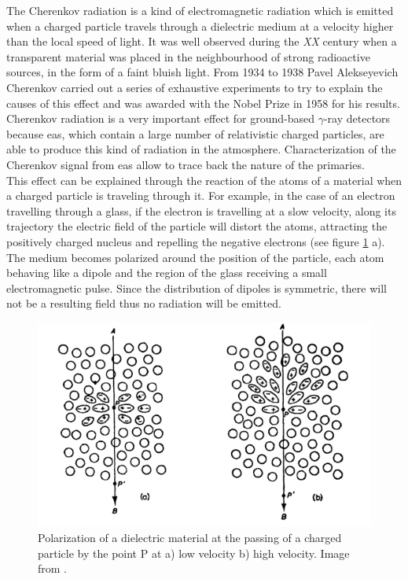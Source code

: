 \documentclass[main.tex]{subfiles}
\begin{document}
The Cherenkov radiation is a kind of electromagnetic radiation which is emitted when a charged particle travels through a dielectric medium at a velocity higher than the local speed of light. It was well observed during the \textit{XX} century when a transparent material was placed in the neighbourhood of strong radioactive sources, in the form of a faint bluish light. From 1934 to 1938 Pavel Alekseyevich Cherenkov carried out a series of exhaustive experiments to try to explain the causes of this effect and was awarded with the Nobel Prize in 1958 for his results.\\
Cherenkov radiation is a very important effect for ground-based $\gamma$-ray detectors because \gls{eas}, which contain a large number of relativistic charged particles, are able to produce this kind of radiation in the atmosphere. Characterization of the Cherenkov signal from \gls{eas} allow to trace back the nature of the primaries.\\
This effect can be explained through the reaction of the atoms of a material when a charged particle is traveling through it. For example, in the case of an electron travelling through a glass, if the electron is travelling at a slow velocity, along its trajectory the electric field of the particle will distort the atoms, attracting the positively charged nucleus and repelling the negative electrons (see figure \ref{fig:polarization} a). The medium becomes polarized around the position of the particle, each atom behaving like a dipole and the region of the glass receiving a small electromagnetic pulse. Since the distribution of dipoles  is symmetric, there will not be a resulting field thus no radiation will be emitted.

\begin{figure}
    \centering
    \includegraphics[width=1\textwidth]{Pictures/polarization.pdf}
    \caption{Polarization of a dielectric material at the passing of a charged particle by the point P at a) low velocity b) high velocity. Image from \cite{jelley1958Cherenkov}.}
    \label{fig:polarization}
\end{figure}
\end{document}
